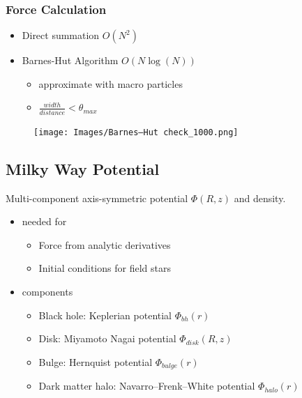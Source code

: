 \documentclass{beamer}
\begin{document}
\begin{frame}
\frametitle{Force Calculation}

\begin{itemize}
\item<1-> Direct summation \(O(N^2)\)
\item<2-> Barnes-Hut Algorithm \(O(N\log(N))\)
	\begin{itemize}
	 \item approximate with macro particles
	 \item \(\frac{width}{distance} < \theta_{max}\)
	\end{itemize}
\end{itemize}

\end{frame}



\begin{frame}
\begin{figure}
\centering
\texttt{[image: Images/Barnes–Hut check\_1000.png]}
\end{figure}
\end{frame}


\subsection{Milky Way Potential}

\begin{frame}

Multi-component axis-symmetric potential \(\Phi \left ( R,z \right )\) and density.

\begin{itemize}
\item<1-> needed for
	\begin{itemize}
	\item Force from analytic derivatives
	\item Initial conditions for field stars
	\end{itemize}
\item<2-> components
	\begin{itemize}
	\item Black hole: Keplerian potential \(\Phi_{bh} \left ( r \right )\)
	\item Disk: Miyamoto Nagai potential \(\Phi_{disk} \left ( R,z \right )\)
	\item Bulge: Hernquist potential \(\Phi_{bulge} \left ( r\right )\)
	\item Dark matter halo: Navarro–Frenk–White potential \(\Phi_{halo} \left ( r \right )\)
	\end{itemize}
\end{itemize}

\end{frame}
\end{document}
